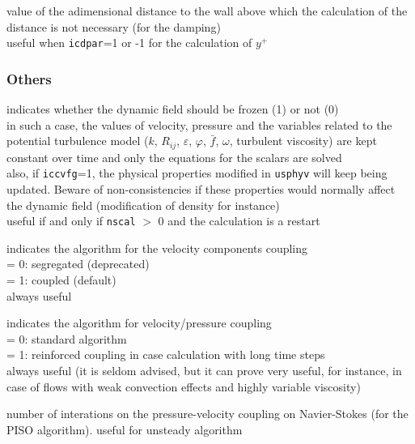 {value of the adimensional distance to the wall above which the
calculation of the distance is not necessary (for the damping)\\
useful when {\tt icdpar}=1 or -1 for the calculation of $y^+$}


\subsubsection{Others}

{indicates whether the dynamic field should be frozen (1) or not (0)\\
in such a case, the values of velocity,
pressure and the variables related to the potential turbulence model
($k$, $R_{ij}$, $\varepsilon$, $\varphi$, $\bar{f}$, $\omega$, turbulent viscosity) are kept
constant over time and only the equations for the scalars are solved\\
also, if {\tt iccvfg}=1, the physical properties modified in \texttt{usphyv} will keep
being updated. Beware of non-consistencies if these properties would normally
affect the dynamic field (modification of density for instance)\\
useful if and only if {\tt nscal} $>$ 0 and the calculation is a restart}

{indicates the algorithm for the velocity components coupling\\
\hspace*{1.3cm}= 0: segregated (deprecated)\\
\hspace*{1.3cm}= 1: coupled (default)\\
always useful
}

{indicates the algorithm for velocity/pressure coupling\\
\hspace*{1.3cm}= 0: standard algorithm\\
\hspace*{1.3cm}= 1: reinforced coupling in case calculation with long
time steps\\
always useful (it is seldom advised, but it can prove very useful, for instance,
in case of flows with weak convection effects and highly variable viscosity)}

{number of interations on the pressure-velocity coupling on Navier-Stokes (for the PISO algorithm).
useful for unsteady algorithm
}

